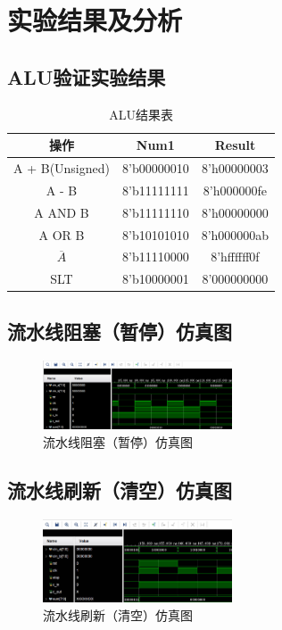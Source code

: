 \section{实验结果及分析}
\subsection{ALU验证实验结果}
\begin{table}[htbp]
    \centering
    \begin{tabular}{c|c|c}
        操作            &	Num1        &	Result\\
        \hline
        A + B(Unsigned) &	8’b00000010 & 8’h00000003	\\
        A - B           &	8’b11111111 & 8’h000000fe   \\
        A AND B         &	8’b11111110 & 8’h00000000	\\
        A OR B          &	8’b10101010 & 8’h000000ab   \\
        $\overline{A}$  &	8’b11110000 & 8’hffffff0f   \\
        SLT             &	8’b10000001 & 8’000000000   \\
        \hline
    \end{tabular}
    \caption{ALU结果表}
    \label{table0}
\end{table}
\subsection{流水线阻塞（暂停）仿真图}
\begin{figure}[htbp]
    \centering
    \includegraphics[width=0.5\textwidth]{image1.png}
    \caption{流水线阻塞（暂停）仿真图}
    \label{image1}
\end{figure}
\subsection{流水线刷新（清空）仿真图}
\begin{figure}[htbp]
    \centering
    \includegraphics[width=0.5\textwidth]{image2.jpg}
    \caption{流水线刷新（清空）仿真图}
    \label{image2}
\end{figure}